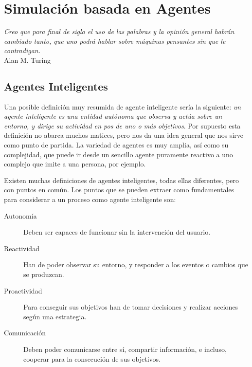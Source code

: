 
\chapter*{Simulación basada en Agentes} \label{cap1}


\begin{flushright}
\begin{minipage}{7.85cm}
    {\em Creo que para final de siglo el uso de las palabras y la opinión
    general habrán cambiado tanto, que uno podrá hablar sobre máquinas pensantes
    sin que le contradigan.} \\ Alan M. Turing
\end{minipage}
\end{flushright}

\vspace*{5mm}

\section*{Agentes Inteligentes}


Una posible definición muy resumida de agente inteligente sería la siguiente:
{\em un agente inteligente es una entidad autónoma que observa y actúa sobre un
entorno, y dirige su actividad en pos de uno o más objetivos}. Por supuesto
esta definición no abarca muchos matices, pero nos da una idea general que nos
sirve como punto de partida. La variedad de agentes es muy amplia, así como
su complejidad, que puede ir desde un sencillo agente puramente reactivo a uno
complejo que imite a una persona, por ejemplo.

Existen muchas definiciones de agentes inteligentes, todas ellas diferentes,
pero con puntos en común. Los puntos que se pueden extraer como fundamentales
para considerar a un proceso como agente inteligente son:

\begin{description}
 \item[Autonomía]Deben ser capaces de funcionar sin la intervención del usuario.
 \item[Reactividad]Han de poder observar su entorno, y responder a los eventos
 o cambios que se produzcan.
 \item[Proactividad]Para conseguir sus objetivos han de tomar decisiones y
 realizar acciones según una estrategia.
 \item[Comunicación]Deben poder comunicarse entre sí, compartir información, e
 incluso, cooperar para la consecución de sus objetivos.
\end{description}


